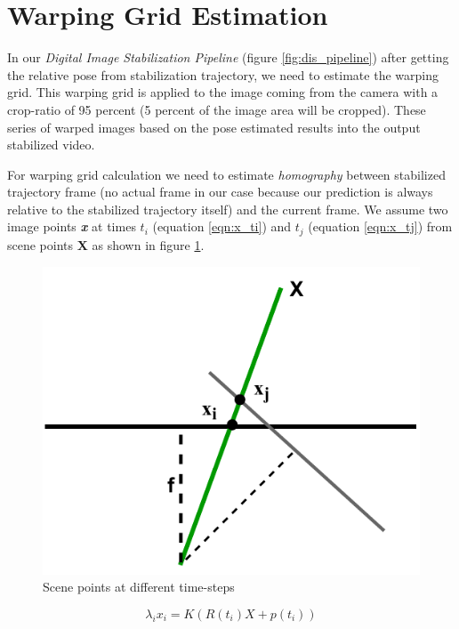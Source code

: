 \section{Warping Grid Estimation}
In our \textit{Digital Image Stabilization Pipeline} (figure \ref{fig:dis_pipeline}) after getting the relative pose from stabilization trajectory, we need to estimate the warping grid. This warping grid is applied to the image coming from the camera with a crop-ratio of 95 percent (5 percent of the image area will be cropped). These series of warped images based on the pose estimated results into the output stabilized video. 

For warping grid calculation we need to estimate \textit{homography} between stabilized trajectory frame (no actual frame in our case because our prediction is always relative to the stabilized trajectory itself) and the current frame. We assume two image points \textbf{\textit{x}} at times $ t_{i} $ (equation \ref{eqn:x_ti}) and $ t_{j} $ (equation \ref{eqn:x_tj}) from scene points \textbf{X} as shown in figure \ref{fig:dis_point_scene}.

\begin{figure}[H]
    \centering
    \includegraphics[scale=0.8]{images/fig_chapter4/dis_point_scene.pdf}
    \caption{Scene points at different time-steps}
    \label{fig:dis_point_scene}
\end{figure}

\begin{equation}
    \lambda_{i} x_{i} = K(R(t_i)X + p(t_i))
\label{eqn:x_ti}
\end{equation}


